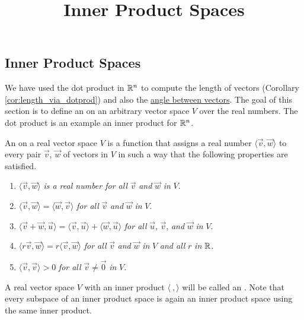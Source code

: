 \documentclass{ximera}
\title{Inner Product Spaces} \license{CC BY-NC-SA 4.0}
\begin{document}
\begin{abstract}
 \end{abstract}
\maketitle

\begin{onlineOnly}
\section*{Inner Product Spaces}
\end{onlineOnly}

We have used the dot product in $\mathbb{R}^n$ to compute the length of vectors (Corollary \ref{cor:length_via_dotprod}) and also the \href{https://ximera.osu.edu/linearalgebradzv3/LinearAlgebraInteractiveIntro/VEC-0060/main}{angle between vectors}. The goal of this section is to define an  on an arbitrary vector space $V$ over the real numbers. The dot product is an example an inner product for $\mathbb{R}^n$.

\begin{definition}\label{def:innerproductspace}
An  on a real vector space $V$ is a function that assigns a real number $\langle\vec{v}, \vec{w}\rangle$ to every pair $\vec{v}$, $\vec{w}$ of vectors in $V$ in such a way that the following properties are satisfied.

\begin{enumerate}
\item\label{prop:inner_prod_1}  $\langle\vec{v}, \vec{w}\rangle$ \textit{is a real number for all} $\vec{v}$ \textit{and} $\vec{w}$ \textit{in} $V$.

\item\label{prop:inner_prod_2}  $\langle\vec{v}, \vec{w}\rangle = \langle\vec{w}, \vec{v}\rangle$ \textit{for all} $\vec{v}$ \textit{and} $\vec{w}$ \textit{in} $V$.

\item\label{prop:inner_prod_3}  $\langle\vec{v} + \vec{w}, \vec{u}\rangle = \langle\vec{v}, \vec{u}\rangle + \langle\vec{w}, \vec{u}\rangle$ \textit{for all} $\vec{u}$, $\vec{v}$, \textit{and} $\vec{w}$ \textit{in} $V$.

\item\label{prop:inner_prod_4} $\langle r\vec{v}, \vec{w}\rangle = r\langle\vec{v}, \vec{w}\rangle$ \textit{for all} $\vec{v}$ \textit{and} $\vec{w}$ \textit{in} $V$ \textit{and all} $r$ \textit{in} $\mathbb{R}$.

\item\label{prop:inner_prod_5}  $\langle\vec{v}, \vec{v}\rangle > 0$ \textit{for all} $\vec{v} \neq \vec{0}$ \textit{in} $V$.

\end{enumerate}
\end{definition}
A real vector space $V$ with an inner product $\langle\ , \rangle$ will be called an .  Note that every subspace of an inner product space is again an inner product space using the same inner product.
\end{document}
